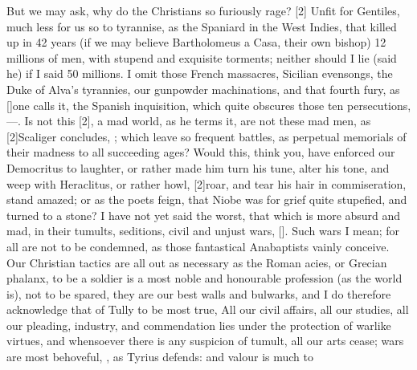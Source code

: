 {But we may ask, why do the Christians so furiously rage? [2\baselineskip] Unfit for Gentiles, much
less for us so to tyrannise, as the Spaniard in the West Indies, that
killed up in 42 years (if we may believe Bartholomeus a Casa,
their own bishop) 12 millions of men, with stupend and exquisite
torments; neither should I lie (said he) if I said 50 millions. I omit
those French massacres, Sicilian evensongs, the Duke of Alva's
tyrannies, our gunpowder machinations, and that fourth fury, as
[\baselineskip]one calls it, the Spanish inquisition, which quite obscures those
ten persecutions, ---. Is not this
[2\baselineskip], a mad world, as he terms it,  are
not these mad men, as [2\baselineskip]Scaliger concludes, ; which leave so frequent battles, as perpetual memorials of
their madness to all succeeding ages? Would this, think you, have
enforced our Democritus to laughter, or rather made him turn his tune,
alter his tone, and weep with Heraclitus, or rather howl,
[2\baselineskip]roar, and tear his hair in commiseration, stand amazed; or as the
poets feign, that Niobe was for grief quite stupefied, and turned to a
stone? I have not yet said the worst, that which is more absurd and
mad, in their tumults, seditions, civil and unjust wars, [\baselineskip]. Such wars I mean; for
all are not to be condemned, as those fantastical Anabaptists vainly
conceive. Our Christian tactics are all out as necessary as the Roman
acies, or Grecian phalanx, to be a soldier is a most noble and
honourable profession (as the world is), not to be spared, they are our
best walls and bulwarks, and I do therefore acknowledge that of
Tully to be most true, All our civil affairs, all our studies, all
our pleading, industry, and commendation lies under the protection of
warlike virtues, and whensoever there is any suspicion of tumult, all
our arts cease; wars are most behoveful, , as Tyrius defends: and valour is much to
}
